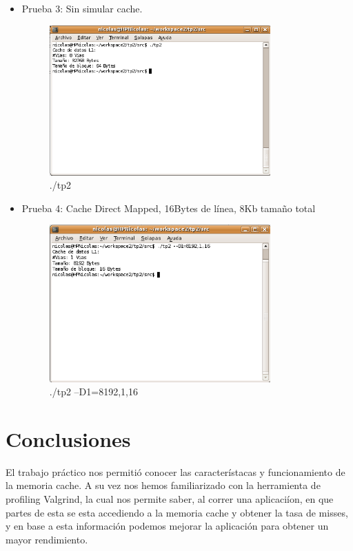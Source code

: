 \documentclass[a4paper,10pt]{article}
\begin{document}
\begin{itemize}
	\newpage

	\item Prueba 3: Sin simular cache.
	\begin{figure}[h]
	\centering
	\includegraphics[width=0.8\textwidth]{Prueba3.png}
	\caption{./tp2}
	\end{figure}

	\item Prueba 4: Cache Direct Mapped, 16Bytes de l\'inea, 8Kb tama\~no total
	\begin{figure}[h]
	\centering
	\includegraphics[width=0.8\textwidth]{Prueba4.png}
	\caption{./tp2 --D1=8192,1,16}
	\end{figure}
\end{itemize}

\newpage

\section{Conclusiones}
El trabajo pr\'actico nos permiti\'o conocer las caracter\'istacas y funcionamiento de la memoria cache. A su vez nos hemos familiarizado con la herramienta de profiling Valgrind, la cual nos permite saber, al correr una aplicaci\'ion, en que partes de esta se esta accediendo a la memoria cache y obtener la tasa de misses, y en base a esta informaci\'on podemos mejorar la aplicaci\'on para obtener un mayor rendimiento.
\end{document}
